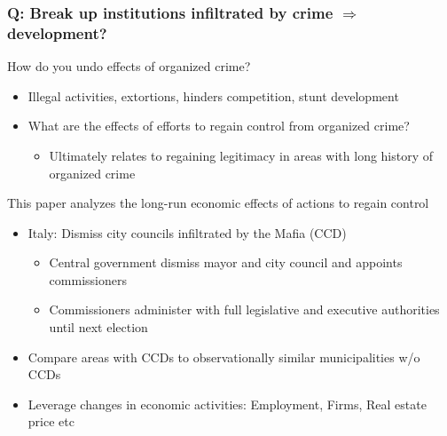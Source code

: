 \documentclass[aspectratio=169]{beamer}
\begin{document}
\begin{frame}
\frametitle{Q: Break up institutions infiltrated by crime $\Rightarrow$ development?} 
How do you undo effects of organized crime?
\begin{itemize}\setlength\itemsep{3pt}
\item Illegal activities, extortions, hinders competition, stunt development
\item What are the effects of efforts to regain control from organized crime?
\begin{itemize}
\item Ultimately relates to regaining legitimacy in areas with long history of organized crime
\end{itemize}
\end{itemize} \medskip
This paper analyzes the long-run economic effects of actions to regain control
\begin{itemize}\setlength\itemsep{3pt}
\item Italy: Dismiss city councils infiltrated by the Mafia (CCD)
\begin{itemize}\setlength\itemsep{3pt}
\item Central government dismiss mayor and city council and appoints commissioners
\item Commissioners administer with full legislative and executive authorities until next election 
\end{itemize}
\item Compare areas with CCDs to observationally similar municipalities w/o CCDs
\item Leverage changes in economic activities: Employment, Firms, Real estate price etc
\end{itemize}
\end{frame}
\end{document}
